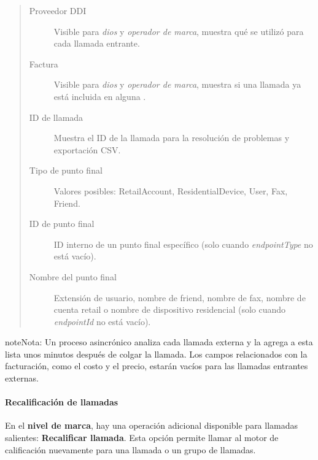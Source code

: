 \documentclass[letterpaper,10pt,spanish]{sphinxmanual}
\begin{document}
\begin{quote}
\begin{description}
\item[{Proveedor DDI}] \leavevmode
Visible para \emph{dios} y \emph{operador de marca}, muestra qué {\hyperref[administration_portal/brand/providers/ddi_providers:ddi\string-providers]{}} se utilizó para cada llamada entrante.

\item[{Factura}] \leavevmode
Visible para \emph{dios} y \emph{operador de marca}, muestra si una llamada ya está incluida en alguna {\hyperref[administration_portal/brand/invoicing/invoices:invoices]{}}.

\item[{ID de llamada}] \leavevmode
Muestra el ID de la llamada para la resolución de problemas y exportación CSV.

\item[{Tipo de punto final}] \leavevmode
Valores posibles: RetailAccount, ResidentialDevice, User, Fax, Friend.

\item[{ID de punto final}] \leavevmode
ID interno de un punto final específico (solo cuando \emph{endpointType} no está vacío).

\item[{Nombre del punto final}] \leavevmode
Extensión de usuario, nombre de friend, nombre de fax, nombre de cuenta retail o nombre de dispositivo residencial (solo cuando \emph{endpointId} no está vacío).

\end{description}
\end{quote}

\begin{notice}{note}{Nota:}
Un proceso asincrónico analiza cada llamada externa y la agrega a esta lista unos minutos después de colgar la llamada. Los campos relacionados con la facturación, como el costo y el precio, estarán vacíos para las llamadas entrantes externas.
\end{notice}


\paragraph{Recalificación de llamadas}
\label{administration_portal/client/retail/calls/external_calls:call-rerating}
En el \textbf{nivel de marca}, hay una operación adicional disponible para llamadas salientes: \textbf{Recalificar llamada}. Esta opción permite llamar al motor de calificación nuevamente para una llamada o un grupo de llamadas.
\end{document}
